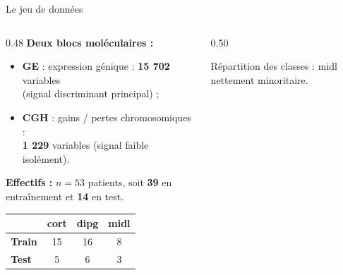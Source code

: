\documentclass[aspectratio=169, 10pt]{beamer}
\begin{document}
\begin{frame}{Le jeu de données}
  \begin{columns}[T]
    \begin{column}{0.48\textwidth}
      \textbf{Deux blocs moléculaires :}\\
      \begin{itemize}
        \item \textcolor{geblue}{\textbf{GE}} : expression génique : \textbf{15 702} variables\\
              (signal discriminant principal) ;
        \item \textcolor{cghred}{\textbf{CGH}} : gains / pertes chromosomiques :\\
              \textbf{1 229} variables (signal faible isolément).
      \end{itemize}

      \medskip
      \textbf{Effectifs :} $n = 53$ patients, soit \textbf{39} en entraînement et \textbf{14} en test.

      \medskip
      \begin{center}
        \small
        \begin{tabular}{lccc}
          \toprule
                         & \textbf{cort} & \textbf{dipg} & \textbf{midl}         \\
          \midrule
          \textbf{Train} & 15            & 16            & \textcolor{geblue}{8} \\
          \textbf{Test}  & 5             & 6             & \textcolor{geblue}{3} \\
          \bottomrule
        \end{tabular}
      \end{center}
    \end{column}

    \begin{column}{0.50\textwidth}
      \centering
      \vskip 2pt
        {\footnotesize Répartition des classes : midl nettement minoritaire.}
    \end{column}
  \end{columns}
\end{frame}
\end{document}
